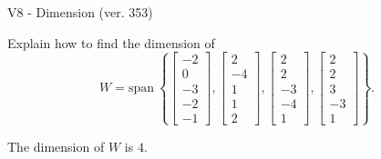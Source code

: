 \begin{exercise}
  \begin{exerciseTitle}V8 - Dimension (ver. 353)\end{exerciseTitle}
  \begin{exerciseStatement}
    Explain how to find the dimension of 
\[W=\mathrm{span}\ \left\{\left[\begin{array}{r}
-2 \\
0 \\
-3 \\
-2 \\
-1
\end{array}\right] , \left[\begin{array}{r}
2 \\
-4 \\
1 \\
1 \\
2
\end{array}\right] , \left[\begin{array}{r}
2 \\
2 \\
-3 \\
-4 \\
1
\end{array}\right] , \left[\begin{array}{r}
2 \\
2 \\
3 \\
-3 \\
1
\end{array}\right]\right\}.\]



  \end{exerciseStatement}
  \begin{exerciseAnswer}
   The dimension of \(W\) is  \(4\).
  


  \end{exerciseAnswer}
\end{exercise}